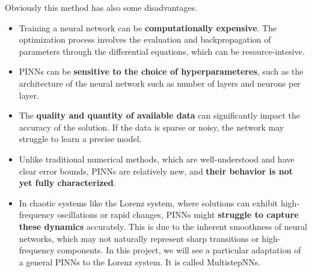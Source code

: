 Obviously this method has also some disadvantages.
\begin{itemize}
    \item Training a neural network can be \textbf{computationally expensive}. The optimization process involves the evaluation and backpropagation of parameters through the differential equations, which can be resource-intesive.
    \item PINNs can be \textbf{sensitive to the choice of hyperparameteres}, such as the architecture of the neural network such as number of layers and neurons per layer.
    \item The \textbf{quality and quantity of available data} can significantly impact the accuracy of the solution. If the data is sparse or noisy, the network may struggle to learn a precise model.
    \item Unlike traditional numerical methods, which are well-understood and have clear error bounds, PINNs are relatively new, and \textbf{their behavior is not yet fully characterized}.
    \item In chaotic systems like the Lorenz system, where solutions can exhibit high-frequency oscillations or rapid changes, PINNs might \textbf{struggle to capture these dynamics} accurately. This is due to the inherent smoothness of neural networks, which may not naturally represent sharp transitions or high-frequency components. In this project, we will see a particular adaptation of a general PINNs to the Lorenz system. It is called MultistepNNs.
\end{itemize}
